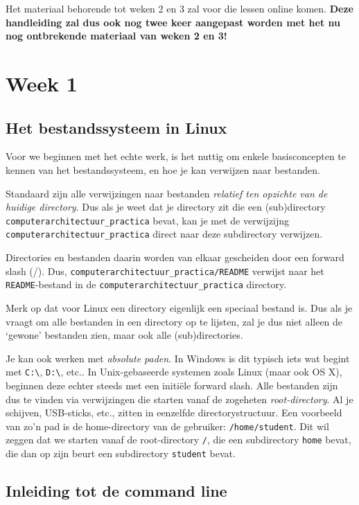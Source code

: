 \documentclass[a4paper,twoside,openany]{memoir}
\begin{document}
Het materiaal behorende tot weken 2 en 3 zal voor die lessen online komen.
\textbf{Deze handleiding zal dus ook nog twee keer aangepast worden met het nu
nog ontbrekende materiaal van weken 2 en 3!}

\part{Week 1}
\chapter{Het bestandssysteem in Linux}
Voor we beginnen met het echte werk, is het nuttig om enkele basisconcepten
te kennen van het bestandssysteem, en hoe je kan verwijzen naar bestanden.

Standaard zijn alle verwijzingen naar bestanden \emph{relatief ten opzichte van
de huidige directory}. Dus als je weet dat je directory zit die een
(sub)directory \verb!computerarchitectuur_practica! bevat, kan
je met de verwijzijng \verb!computerarchitectuur_practica! direct naar deze
subdirectory verwijzen.

Directories en bestanden daarin worden van elkaar gescheiden door een forward
slash (/). Dus, \verb!computerarchitectuur_practica/README! verwijst naar
het \verb!README!-bestand in de \verb!computerarchitectuur_practica! directory.

Merk op dat voor Linux een directory eigenlijk een speciaal bestand is. Dus
als je vraagt om alle bestanden in een directory op te lijsten, zal je dus
niet alleen de `gewone' bestanden zien, maar ook alle (sub)directories.

Je kan ook werken met \emph{absolute paden}. In Windows is dit typisch iets wat
begint met \verb!C:\!, \verb!D:\!, etc.. In Unix-gebaseerde systemen zoals
Linux (maar ook OS X),
beginnen deze echter steeds met een initiële forward slash. Alle bestanden zijn
dus te vinden via verwijzingen die starten vanaf de zogeheten
\emph{root-directory}. Al je schijven, USB-sticks, etc., zitten in eenzelfde
directorystructuur. Een voorbeeld van zo'n pad is de
home-directory van de gebruiker: \verb!/home/student!. Dit wil zeggen dat we starten vanaf de
root-directory \verb!/!, die een subdirectory \verb!home! bevat, die dan op zijn
beurt een subdirectory \verb!student! bevat.


\chapter{Inleiding tot de command line}
\end{document}

